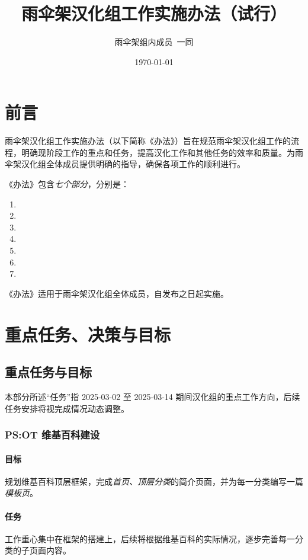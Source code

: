 \documentclass[UTF8, a4paper, 12pt]{ctexart}
\title{\textbf{雨伞架汉化组工作实施办法（试行）}}
\author{雨伞架组内成员\ 一同}
\date{\today}
\begin{document}
\setcounter{page}{0}
\thispagestyle{empty}
\maketitle
\section*{前言}
雨伞架汉化组工作实施办法（以下简称《办法》）旨在规范雨伞架汉化组工作的流程，明确现阶段工作的重点和任务，提高汉化工作和其他任务的效率和质量。为雨伞架汉化组全体成员提供明确的指导，确保各项工作的顺利进行。

《办法》包含\emph{七个部分}，分别是：

\begin{enumerate}
    \item {}
    \item {}
    \item {}
    \item {}
    \item {}
    \item {}
    \item {}
\end{enumerate}

《办法》适用于雨伞架汉化组全体成员，自发布之日起实施。
\newpage
\setcounter{page}{1}
\tableofcontents
\newpage
\section{重点任务、决策与目标}\label{sec1}
\subsection{重点任务与目标}
本部分所述“任务”指 2025-03-02 至 2025-03-14 期间汉化组的重点工作方向，后续任务安排将视完成情况动态调整。

\subsubsection{PS:OT 维基百科建设}
\paragraph{目标} 规划维基百科顶层框架，完成\emph{首页、顶层分类}的简介页面，并为每一分类编写一篇\emph{模板页}。

\paragraph{任务} 工作重心集中在框架的搭建上，后续将根据维基百科的实际情况，逐步完善每一分类的子页面内容。
\end{document}
